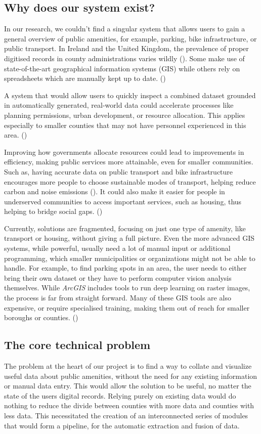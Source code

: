 \subsection{Why does our system exist?}
In our research, we couldn't find a singular system that allows users to gain a
general overview of public amenities, for example, parking, bike infrastructure,
or public transport. In Ireland and the United Kingdom, the prevalence of proper
digitised records in county administrations varies wildly
(\cite{WebAccessibilityIreland}). Some make use of state-of-the-art geographical
information systems (GIS) while others rely on spreadsheets which are manually
kept up to date. (\cite{mcguirk2001changing})

A system that would allow users to quickly inspect a combined dataset
grounded in automatically generated, real-world data could accelerate processes
like planning permissions, urban development, or resource allocation. This
applies especially to smaller counties that may not have personnel experienced
in this area. (\cite{clark2002amenities})

Improving how governments allocate resources could lead to
improvements in efficiency, making public services more attainable, even for
smaller communities. Such as, having accurate data on public transport and
bike infrastructure encourages more people to choose sustainable modes of
transport, helping reduce carbon and noise emissions (\cite{MUGION20181566}). It
could also make it easier for people in underserved communities to access
important services, such as housing, thus helping to bridge social gaps.
(\cite{allen2015understanding})

\newpage{}

Currently, solutions are fragmented, focusing on just one type of
amenity, like transport or housing, without giving a full picture. Even the more
advanced GIS systems, while powerful, usually need a lot of manual input or
additional programming, which smaller municipalities or organizations might not
be able to handle. For example, to find parking spots in an area, the user needs to
either bring their own dataset or they have to perform computer vision analysis
themselves. While \textit{ArcGIS} includes tools to run deep learning on raster
images, the process is far from straight forward. Many of these GIS tools are also
expensive, or require specialised training, making them out of reach for smaller
boroughs or counties. (\cite{kaufmann2022scaling})

\subsection{The core technical problem}
The problem at the heart of our project is to find a way to collate and
visualize useful data about public amenities, without the need for any existing
information or manual data entry. This would allow the solution to be useful, no
matter the state of the users digital records. Relying purely on existing data
would do nothing to reduce the divide between counties with more data and
counties with less data. This necessitated the creation of an interconnected
series of modules that would form a pipeline, for the automatic extraction and
fusion of data.


